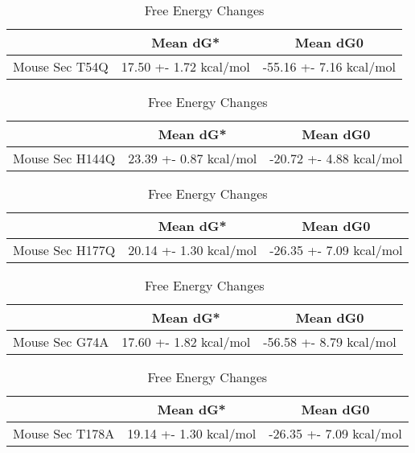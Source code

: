 \begin{table}[ht]
  \centering
  \begin{tabular}{|c|c|c|}
  \hline
    & Mean dG* & Mean dG0 \\
  \hline
  Mouse Sec T54Q & 17.50 +- 1.72 kcal/mol & -55.16 +- 7.16 kcal/mol \\
  \hline
  \end{tabular}
  \caption{Free Energy Changes}
\end{table}

\begin{table}[ht]
  \centering
  \begin{tabular}{|c|c|c|}
  \hline
    & Mean dG* & Mean dG0 \\
  \hline
  Mouse Sec H144Q & 23.39 +- 0.87 kcal/mol & -20.72 +- 4.88 kcal/mol \\
  \hline
  \end{tabular}
  \caption{Free Energy Changes}
\end{table}

\begin{table}[ht]
  \centering
  \begin{tabular}{|c|c|c|}
  \hline
    & Mean dG* & Mean dG0 \\
  \hline
  Mouse Sec H177Q & 20.14 +- 1.30 kcal/mol & -26.35 +- 7.09 kcal/mol \\
  \hline
  \end{tabular}
  \caption{Free Energy Changes}
\end{table}

\begin{table}[ht]
  \centering
  \begin{tabular}{|c|c|c|}
  \hline
    & Mean dG* & Mean dG0 \\
  \hline
  Mouse Sec G74A & 17.60 +- 1.82 kcal/mol & -56.58 +- 8.79 kcal/mol \\
  \hline
  \end{tabular}
  \caption{Free Energy Changes}
\end{table}

\begin{table}[ht]
  \centering
  \begin{tabular}{|c|c|c|}
  \hline
    & Mean dG* & Mean dG0 \\
  \hline
  Mouse Sec T178A & 19.14 +- 1.30 kcal/mol & -26.35 +- 7.09 kcal/mol \\
  \hline
  \end{tabular}
  \caption{Free Energy Changes}
\end{table}

